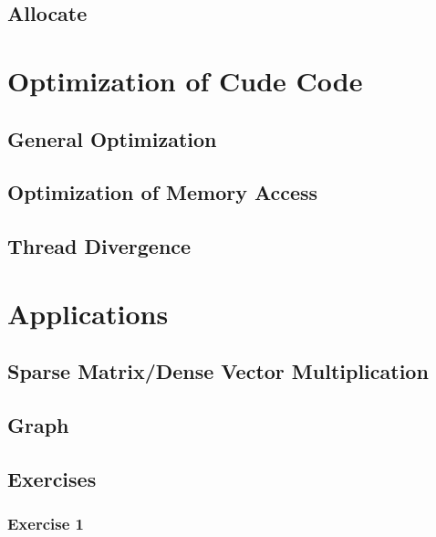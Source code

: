 \documentclass[12px,oz]{report}
\theoremstyle{indented}
\begin{document}
	\section{Allocate}
	\label{sec-allocate}
	
	
\chapter{Optimization of Cude Code}
\label{ch-opti-intro}


\section{General Optimization}
\label{sec-general-opti}


\section{Optimization of Memory Access}
\label{sec-opti-memory}


\section{Thread Divergence}
\label{sec-thread-div}


\chapter{Applications}
\label{ch-app}

	
	\section{Sparse Matrix/Dense Vector Multiplication}
	\label{sec-matrix}
	
	
	\section{Graph}
	\label{sec-graph}
	
	
	\section{Exercises}
	
		\subsection{Exercise 1}
		
\end{document}

